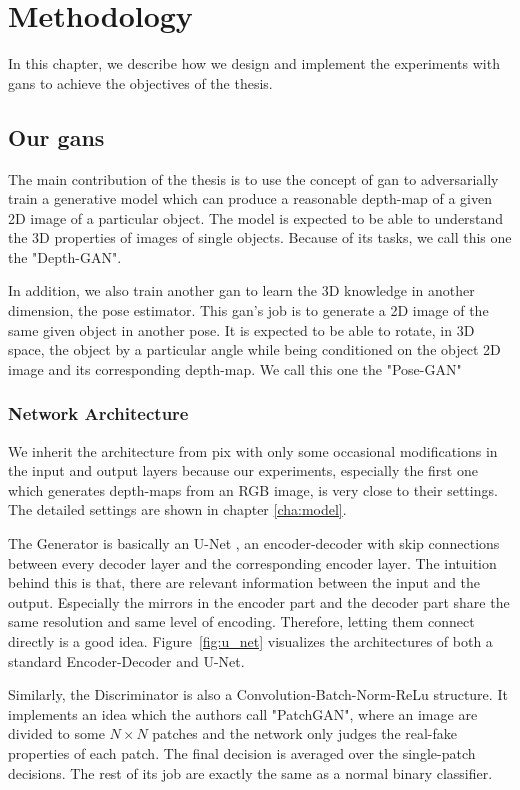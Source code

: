\chapter{Methodology\label{cha:methodology}}
In this chapter, we describe how we design and implement the experiments with
\acrshort{gan}s to achieve the objectives of the thesis.

\section{Our \acrshort{gan}s }
The main contribution of the thesis is to use the concept of \acrshort{gan} to
adversarially train a generative model which can produce a reasonable depth-map of a
given 2D image of a particular object. The model is expected to be able to
understand the 3D properties of images of single objects. Because of its tasks, we call
this one the "Depth-GAN".

In addition, we also train another \acrshort{gan} to learn the 3D knowledge in another
dimension, the pose estimator. This \acrshort{gan}'s job is to generate a 2D image of the
same given object in another pose. It is expected to be able to rotate, in 3D space, the
object by a particular angle while being conditioned on the object 2D image and its
corresponding depth-map. We call this one the "Pose-GAN"

\subsection{Network Architecture}

We inherit the architecture from \acrshort{pix} with only some occasional modifications in
the input and output layers because our experiments, especially the first one which
generates depth-maps from an RGB image, is very close to their settings. The detailed
settings are shown in chapter \ref{cha:model}.

The Generator is basically an U-Net \cite{u_net}, an encoder-decoder with skip
connections between every decoder layer and the corresponding encoder layer. The intuition
behind this is that, there are relevant information between the input and the output.
Especially the mirrors in the encoder part and the decoder part share the same resolution
and same level of encoding. Therefore, letting them connect directly is a good idea.
Figure~\ref{fig:u_net} visualizes the architectures of both a standard Encoder-Decoder and
U-Net.

Similarly, the Discriminator is also a Convolution-Batch-Norm-ReLu structure. It
implements an idea which the authors call "PatchGAN", where an image are divided to some
$N \times N$ patches and the network only judges the real-fake properties of each patch.
The final decision is averaged over the single-patch decisions. The rest of its job are
exactly the same as a normal binary classifier.

